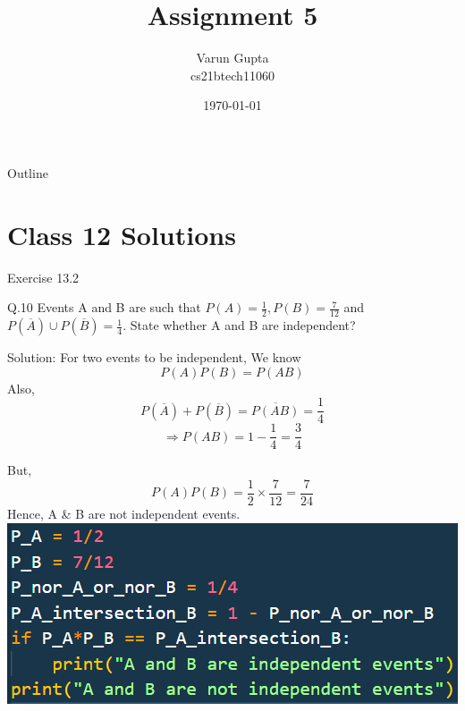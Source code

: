 \documentclass{beamer}
\title{Assignment 5}
\author{Varun Gupta \\ cs21btech11060}
\date{\today}
\begin{document}
\begin{frame}
    \titlepage 
\end{frame}

\logo{}


\begin{frame}{Outline}
    \tableofcontents
\end{frame}

\section{Class 12 Solutions}
\begin{frame}{Exercise 13.2}
    \begin{block}{Q.10}
        Events A and B are such that $P(A) = \frac{1}{2}, P(B) = \frac{7}{12}$ and $P(\overline{A}) \cup P(\overline{B}) = \frac{1}{4}$. State whether A and B are independent?
    \end{block}
    \begin{block}{Solution:}
        For two events to be independent, We know
        \begin{equation}
            P(A)P(B) = P(AB)
        \end{equation}
        Also,
        \begin{equation}
            P(\overline{A})+P(\overline{B}) = \overline{P(AB)} = \frac{1}{4}
        \end{equation}
        \begin{equation}
            \Rightarrow P(AB) = 1-\frac{1}{4} = \frac{3}{4}
        \end{equation}
    \end{block}
\end{frame}
\begin{frame}
        But,
        \begin{equation}
            P(A)P(B) = \frac{1}{2} \times \frac{7}{12} = \frac{7}{24}
        \end{equation}
        Hence, A \& B are not independent events.
        \includegraphics{figures/fig.png}
\end{frame}
\end{document}
